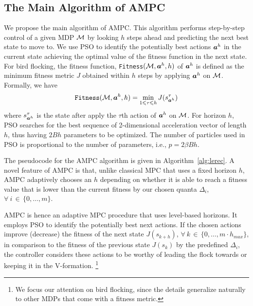 	\subsection{The Main Algorithm of AMPC}
\label{sec:lerec}
We propose the main algorithm of AMPC. %
This algorithm performs step-by-step control of a given MDP ${\mathcal{M}}$ by looking $h$ steps ahead and predicting the next best state to move to.
We use PSO to identify the potentially best actions ${\boldsymbol {a}}^h$ in the current state achieving the optimal value of the fitness function in the next state.  For bird flocking, the fitness function, \texttt{Fitness}$({\mathcal{M}},{\boldsymbol {a}}^h,h)$ of ${\boldsymbol {a}}^h$ is defined as the minimum fitness metric $J$ obtained within $h$ steps by applying ${\boldsymbol {a}}^h$ on ${\mathcal{M}}$. Formally, we have
\vspace*{-2mm}
\begin{align}
\texttt{Fitness}({\mathcal{M}},{\boldsymbol {a}}^h,h) = \min_{1\leqslant \tau \leqslant h}{J(s_{{\boldsymbol {a}}^h}^\tau)}
\end{align}
where $s_{{\boldsymbol {a}}^h}^\tau$ is the state after apply the $\tau$th action of ${\boldsymbol {a}}^h$ on ${\mathcal{M}}$. For horizon $h$, PSO searches for the best sequence of 2-dimensional acceleration vector of length $h$, thus having $2Bh$ parameters to be optimized. The number of particles used in PSO is proportional to the number of parameters, i.e., $p = 2\beta B h$.

The pseudocode for the AMPC algorithm is given in Algorithm~\ref{alg:lerec}. A novel feature of AMPC is that, unlike classical MPC that uses a fixed horizon $h$, AMPC adaptively chooses an $h$ depending on whether it is able to reach a fitness value that is lower than the current fitness by our chosen quanta $\Delta_i$, $\forall~i\,{\in}\,\{0,\ldots,m\}$.

AMPC is hence an adaptive MPC procedure that uses level-based horizons.
It employs PSO to identify the potentially best next actions.
If the chosen actions improve (decrease) the fitness of the next state $J(s_{k+h})$, $\forall~k\,{\in}\,\{0,\ldots,m\cdot h_{\mathit{max}}\}$, in comparison to the fitness of the previous state $J(s_k)$ by the predefined $\Delta_i$, the controller considers these actions to be worthy of leading the flock towards or keeping it in the V-formation.%
\footnote{We focus our attention on bird flocking, since the details generalize naturally to other MDPs that come with a fitness metric.}

